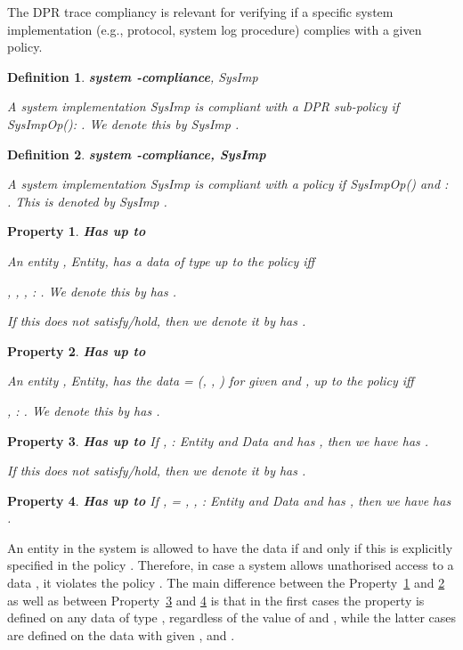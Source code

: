 \documentclass[a4paper]{article}
\newtheorem{ttd}{Definition}
\newtheorem{ttp}{Property}
\begin{document}
 
The DPR trace compliancy is relevant for verifying if a specific system implementation (e.g., protocol, system log procedure) complies with a given policy. 

\begin{ttd}\textbf{system -compliance}, \textit{SysImp}  

\noindent A system implementation \textit{SysImp} is compliant with a DPR sub-policy  if   \textit{SysImpOp}():   .  We denote this by \textit{SysImp}  .   
\end{ttd} 


\begin{ttd}\textbf{system -compliance, \textit{SysImp}  }

\noindent A system implementation \textit{SysImp} is compliant with a policy  if   \textit{SysImpOp}() and   :   . This is denoted by \textit{SysImp}  .   
\end{ttd} 


\begin{ttp}\label{prop:has1}\textbf{Has  up to }

An entity ,   \textit{Entity}, has a data of type up to  the policy  iff 

 , , , :     . We denote this by  has . 

If this does not satisfy/hold, then we denote it by  has . 
\end{ttp}

\begin{ttp}\label{prop:has2}\textbf{Has  up to }

An entity ,   \textit{Entity}, has the data  = (, , ) for given  and , up to the policy  iff  

 , :     . We denote this by  has .

\end{ttp}    

\begin{ttp}\label{prop:has3}\textbf{Has  up to }
If , :   \textit{Entity} and   \textit{Data} and  has , then we have  has .   

If this does not satisfy/hold, then we denote it by  has . 
\end{ttp}   


\begin{ttp}\label{prop:has4}\textbf{Has  up to }
If ,  = , , :   \textit{Entity} and   \textit{Data} and  has , then we have  has .   
\end{ttp}   

An entity in the system is allowed to have the data  if and only if this is explicitly specified in the policy . Therefore, in case a system allows unathorised access to a data , it violates the policy  . The main difference between the Property~\ref{prop:has1} and \ref{prop:has2} as well as between  Property~\ref{prop:has3} and \ref{prop:has4} is that in the first cases the property is defined on any data of type , regardless of the value of  and , while the latter cases are defined on the data with given ,  and . 
\end{document}

